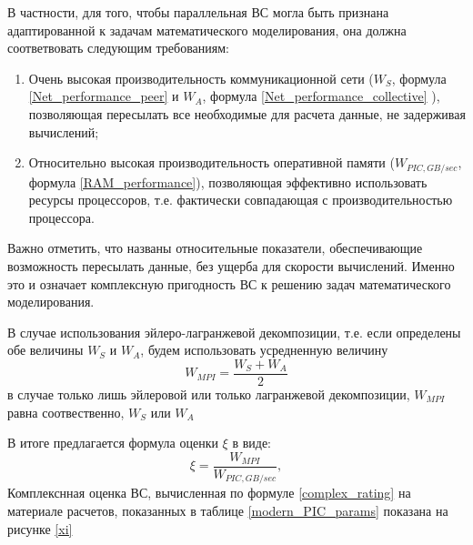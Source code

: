 В частности, для того, чтобы параллельная ВС могла быть признана адаптированной к задачам математического моделирования, она должна соответвовать следующим требованиям:
\begin{enumerate}
	\item Очень высокая производительность коммуникационной сети ($W_S$, формула \ref{Net_performance_peer} и $W_A$, формула \ref{Net_performance_collective} ), позволяющая пересылать все необходимые для расчета данные, не задерживая вычислений;
	
	\item Относительно высокая производительность оперативной памяти ($W_{PIC,GB/sec}$, формула \ref{RAM_performance}), позволяющая эффективно использовать ресурсы процессоров, т.е. фактически совпадающая с производительностью процессора.  	
\end{enumerate}

Важно отметить, что названы относительные показатели, обеспечивающие возможность пересылать данные, без ущерба для скорости вычислений. Именно это и означает  комплексную пригодность ВС к решению задач математического моделирования.

В случае использования эйлеро-лагранжевой декомпозиции, т.е. если определены обе величины $W_S$ и $W_A$, будем использовать усредненную величину
\begin{equation}
W_{MPI} = \frac{W_S + W_A}{2}
\end{equation}
в случае только лишь эйлеровой или только лагранжевой декомпозиции, $W_{MPI}$ равна соотвественно, $W_S$ или $W_A$

В итоге предлагается формула оценки $\xi$ в виде:
\begin{equation}
\xi = \frac{W_{MPI}} { W_{PIC,GB/sec}}, 
\label{complex_rating}
\end{equation}
Комплекснная оценка ВС, вычисленная по формуле \ref{complex_rating}
на материале расчетов, показанных в таблице \ref{modern_PIC_params}
показана на рисунке \ref{xi}

